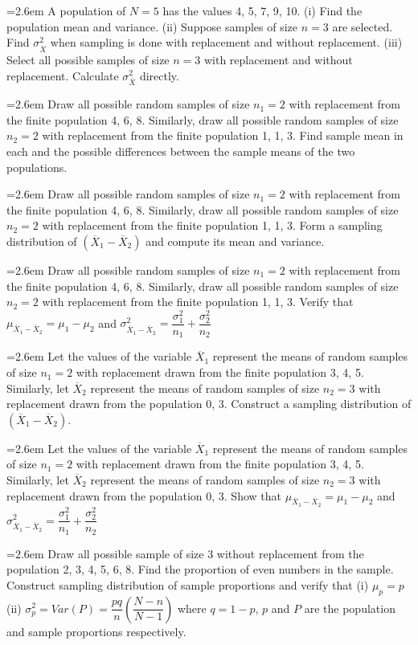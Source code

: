 \documentclass[11pt,a4paper]{article}
\newcommand{\Q}[2]{\par\smallskip\noindent\hangindent=2.6em\hangafter=1
  \makebox[2.6em][l]{\textbf{#1.}}#2\par}
\begin{document}
\Q{141}{A population of $N=5$ has the values 4, 5, 7, 9, 10. (i) Find the population mean and variance. (ii) Suppose samples of size $n=3$ are selected. Find $\sigma^{2}_{\overline{X}}$ when sampling is done with replacement and without replacement. (iii) Select all possible samples of size $n=3$ with replacement and without replacement. Calculate $\sigma^{2}_{\overline{X}}$ directly.}
\Q{142}{Draw all possible random samples of size $n_{1}=2$ with replacement from the finite population 4, 6, 8. Similarly, draw all possible random samples of size $n_{2}=2$ with replacement from the finite population 1, 1, 3. Find sample mean in each and the possible differences between the sample means of the two populations.}
\Q{143}{Draw all possible random samples of size $n_{1}=2$ with replacement from the finite population 4, 6, 8. Similarly, draw all possible random samples of size $n_{2}=2$ with replacement from the finite population 1, 1, 3. Form a sampling distribution of $(\overline{X}_{1}-\overline{X}_{2})$ and compute its mean and variance.}
\Q{144}{Draw all possible random samples of size $n_{1}=2$ with replacement from the finite population 4, 6, 8. Similarly, draw all possible random samples of size $n_{2}=2$ with replacement from the finite population 1, 1, 3. Verify that $\mu_{\overline{X}_{1}-\overline{X}_{2}}=\mu_{1}-\mu_{2}$ and $\sigma^{2}_{\overline{X}_{1}-\overline{X}_{2}}=\dfrac{\sigma_{1}^{2}}{n_{1}}+\dfrac{\sigma_{2}^{2}}{n_{2}}$}
\Q{145}{Let the values of the variable $\overline{X}_{1}$ represent the means of random samples of size $n_{1}=2$ with replacement drawn from the finite population 3, 4, 5. Similarly, let $\overline{X}_{2}$ represent the means of random samples of size $n_{2}=3$ with replacement drawn from the population 0, 3. Construct a sampling distribution of $(\overline{X}_{1}-\overline{X}_{2})$.}
\Q{146}{Let the values of the variable $\overline{X}_{1}$ represent the means of random samples of size $n_{1}=2$ with replacement drawn from the finite population 3, 4, 5. Similarly, let $\overline{X}_{2}$ represent the means of random samples of size $n_{2}=3$ with replacement drawn from the population 0, 3. Show that $\mu_{\overline{X}_{1}-\overline{X}_{2}}=\mu_{1}-\mu_{2}$ and $\sigma^{2}_{\overline{X}_{1}-\overline{X}_{2}}=\dfrac{\sigma_{1}^{2}}{n_{1}}+\dfrac{\sigma_{2}^{2}}{n_{2}}$}
\Q{147}{Draw all possible sample of size 3 without replacement from the population 2, 3, 4, 5, 6, 8. Find the proportion of even numbers in the sample. Construct sampling distribution of sample proportions and verify that (i) $\mu_{p}=p$ (ii) $\sigma^{2}_{p}=Var(P)=\dfrac{pq}{n}\left(\dfrac{N-n}{N-1}\right)$ where $q=1-p$, $p$ and $P$ are the population and sample proportions respectively.}
\end{document}
